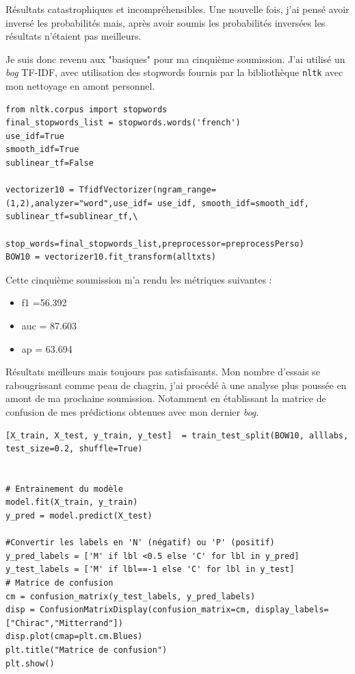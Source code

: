 \documentclass[a4paper,12pt]{article}
\begin{document}
Résultats catastrophiques et incompréhensibles. Une nouvelle fois, j'ai pensé avoir inversé les probabilités mais, après avoir soumis les probabilités inversées les résultats n'étaient pas meilleurs.

Je suis donc revenu aux "basiques" pour ma cinquième soumission. J'ai utilisé un \textit{bog} TF-IDF, avec utilisation des stopwords fournis par la bibliothèque \texttt{nltk} avec mon nettoyage en amont personnel.

\begin{lstlisting}
from nltk.corpus import stopwords
final_stopwords_list = stopwords.words('french')
use_idf=True
smooth_idf=True
sublinear_tf=False

vectorizer10 = TfidfVectorizer(ngram_range=(1,2),analyzer="word",use_idf= use_idf, smooth_idf=smooth_idf, sublinear_tf=sublinear_tf,\
                            stop_words=final_stopwords_list,preprocessor=preprocessPerso)
BOW10 = vectorizer10.fit_transform(alltxts)
\end{lstlisting}

Cette cinquième soumission m'a rendu les métriques suivantes :
\begin{itemize}
\item f1 =56.392
\item auc = 87.603
\item ap = 63.694
\end{itemize}

Résultats meilleurs mais toujours pas satisfaisants. Mon nombre d'essais se rabougrissant comme peau de chagrin, j'ai procédé à une analyse plus poussée en amont de ma prochaine soumission. Notamment en établissant la matrice de confusion de mes prédictions obtenues avec mon dernier \textit{bog}.


\begin{lstlisting}
[X_train, X_test, y_train, y_test]  = train_test_split(BOW10, alllabs, test_size=0.2, shuffle=True)


# Entrainement du modèle
model.fit(X_train, y_train)
y_pred = model.predict(X_test)

#Convertir les labels en 'N' (négatif) ou 'P' (positif)
y_pred_labels = ['M' if lbl <0.5 else 'C' for lbl in y_pred]
y_test_labels = ['M' if lbl==-1 else 'C' for lbl in y_test]
# Matrice de confusion
cm = confusion_matrix(y_test_labels, y_pred_labels)
disp = ConfusionMatrixDisplay(confusion_matrix=cm, display_labels=["Chirac","Mitterrand"])
disp.plot(cmap=plt.cm.Blues)
plt.title("Matrice de confusion")
plt.show()

\end{lstlisting}
\end{document}
